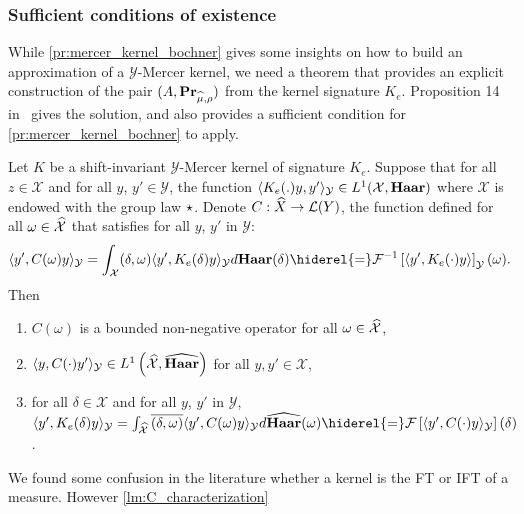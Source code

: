 \documentclass[twoside,11pt]{article}
\begin{document}
\subsubsection{Sufficient conditions of existence}
\label{subsec:sufficient_conditions}
While \cref{pr:mercer_kernel_bochner} gives some insights on how to build an
approximation of a $\mathcal{Y}$-Mercer kernel, we need a theorem that provides
an explicit construction of the pair $(A, {\mathbf{{Pr}}}_{\widehat{\mu},\rho})$ from
the kernel signature $K_e$. Proposition 14 in~\citet{Carmeli2010} gives the
solution, and also provides a sufficient condition for
\cref{pr:mercer_kernel_bochner} to apply.
\begin{proposition}
\label{pr:inverse_ovk_Fourier_decomposition}
    Let $K$ be a shift-invariant $\mathcal{Y}$-Mercer kernel of signature
    $K_e$.  Suppose that for all $z \in \mathcal{X}$ and for all $y$, $y'
    \in\mathcal{Y}$, the function $\langle K_e(.)y,y'\rangle_{\mathcal{Y}}\in
    L^1(\mathcal{X},\mathbf{Haar})$ where $\mathcal{X}$ is endowed with the group law
    $\star$. Denote $C: \widehat{X} \to \mathcal{L}(Y)$, the function defined
    for all $\omega \in \widehat{\mathcal{X}}$ that satisfies for all $y$, $y'$ in
    $\mathcal{Y}$:
    \begin{dmath}\label{eq:CK0}
        \inner{y',C(\omega)y}_{\mathcal{Y}}= \int_{\mathcal{X}}
        \pairing{\delta, \omega}\inner{y',
        K_e(\delta)y}_{\mathcal{Y}}d\Haar(\delta) \hiderel{=} \IFT{\inner{y',
        K_e(\cdot)y}}_{\mathcal{Y}}(\omega).
    \end{dmath}
    Then
    \begin{enumerate}
        \item $C(\omega)$ is a bounded non-negative operator for all $\omega
        \in \widehat{\mathcal{X}}$,
        \item $\langle y, C(\cdot)y'\rangle_{\mathcal{Y}}\in
        L^1\left(\widehat{\mathcal{X}},\widehat{\mathbf{Haar}}\right)$ for all
        $y,y'\in\mathcal{X}$,
        \item for all $\delta\in\mathcal{X}$ and for all $y$, $y'$ in
        $\mathcal{Y}$, $\inner{y', K_e(\delta)y}_{\mathcal{Y}}=
        \int_{\dual{\mathcal{X}}}\conj{\pairing{\delta,\omega}}\inner{y',
        C(\omega)y}_{\mathcal{Y}}d\dual{\Haar}(\omega) \hiderel{=}
        \FT{\inner{y', C(\cdot)y}_{\mathcal{Y}}}(\delta)$.
    \end{enumerate}
\end{proposition}
We found some confusion in the literature whether a kernel is the
\acl{FT} or \acl{IFT} of a measure. However \cref{lm:C_characterization}
\end{document}
